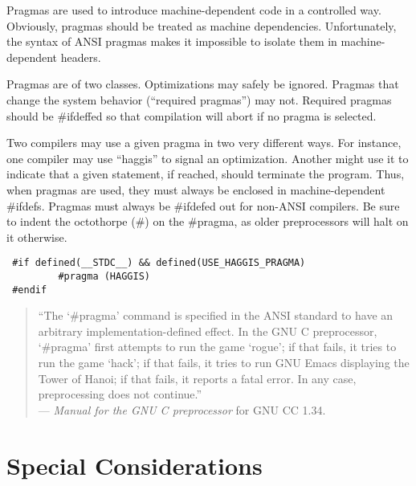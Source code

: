 Pragmas are used to introduce machine-dependent code in a controlled way.
Obviously, pragmas should be treated as machine dependencies. Unfortunately,
the syntax of ANSI pragmas makes it impossible to isolate them in
machine-dependent headers. 

Pragmas are of two classes. Optimizations may safely be ignored. Pragmas that
change the system behavior (``required pragmas'') may not. Required pragmas
should be \#ifdeffed so that compilation will abort if no pragma is selected. 

 Two compilers may use a given pragma in two very different ways. For instance,
one compiler may use ``haggis'' to signal an optimization. Another might use it
to indicate that a given statement, if reached, should terminate the program.
Thus, when pragmas are used, they must always be enclosed in machine-dependent
\#ifdefs. Pragmas must always be \#ifdefed out for non-ANSI compilers. Be sure
to indent the octothorpe (\#) on the \#pragma, as older preprocessors will halt
on it otherwise. 
\begin{verbatim}
 #if defined(__STDC__) && defined(USE_HAGGIS_PRAGMA)
         #pragma (HAGGIS)
 #endif
\end{verbatim}
\begin{quote}
``The `\#pragma' command is specified in the ANSI standard to have an arbitrary
implementation-defined effect. In the GNU C preprocessor, `\#pragma' first
attempts to run the game `rogue'; if that fails, it tries to run the game
`hack'; if that fails, it tries to run GNU Emacs displaying the Tower of
Hanoi; if that fails, it reports a fatal error. In any case, preprocessing
does not continue.'' \\
\mbox{}\hfill--- {\em Manual for the GNU C preprocessor} for GNU CC 1.34.
\end{quote}

\section{Special Considerations}

